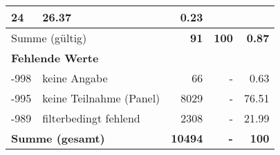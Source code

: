 \begin{longtable}{lXrrr}
       \num{24} &
       \num[round-mode=places,round-precision=2]{26.37} &
         \num[round-mode=places,round-precision=2]{0.23} \\
     \midrule
     \multicolumn{2}{l}{Summe (gültig)} &
       \textbf{\num{91}} &
     \textbf{\num{100}} &
       \textbf{\num[round-mode=places,round-precision=2]{0.87}} \\
     \multicolumn{5}{l}{\textbf{Fehlende Werte}}\\
       -998 &
       keine Angabe &
         \num{66} &
        - &
         \num[round-mode=places,round-precision=2]{0.63} \\
       -995 &
       keine Teilnahme (Panel) &
         \num{8029} &
        - &
         \num[round-mode=places,round-precision=2]{76.51} \\
       -989 &
       filterbedingt fehlend &
         \num{2308} &
        - &
         \num[round-mode=places,round-precision=2]{21.99} \\
     \midrule
     \multicolumn{2}{l}{\textbf{Summe (gesamt)}} &
          \textbf{\num{10494}} &
        \textbf{-} &
        \textbf{\num{100}} \\
     \bottomrule
     \end{longtable}
     
